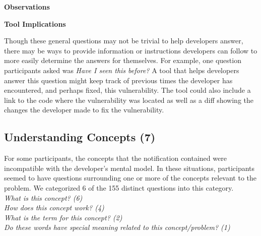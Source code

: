 \documentclass[conference]{IEEEtran}
\begin{document}
\noindent\textbf{Observations}

% 




\noindent\textbf{Tool Implications}

Though these general questions may not be trivial to help developers answer, there may be ways to provide information or instructions developers can follow to more easily determine the answers for themselves. 
For example, one question participants asked was \textit{Have I seen this before?}
A tool that helps developers answer this question might keep track of previous times the developer has encountered, and perhaps fixed, this vulnerability. 
The tool could also include a link to the code where the vulnerability was located as well as a diff showing the changes the developer made to fix the vulnerability.



\noindent\subsection{\textbf{Understanding Concepts (7)}}\label{uc}

For some participants, the concepts that the notification contained were incompatible with the developer's mental model. 
In these situations, participants seemed to have questions surrounding one or more of the concepts relevant to the problem.
We categorized 6 of the 155 distinct questions into this category. 
\\

\noindent\emph{What is this concept? (6)} \\
\emph{How does this concept work? (4)} \\
\emph{What is the term for this concept? (2)} \\
\emph{Do these words have special meaning related to this concept/problem? (1)} \\
\end{document}
